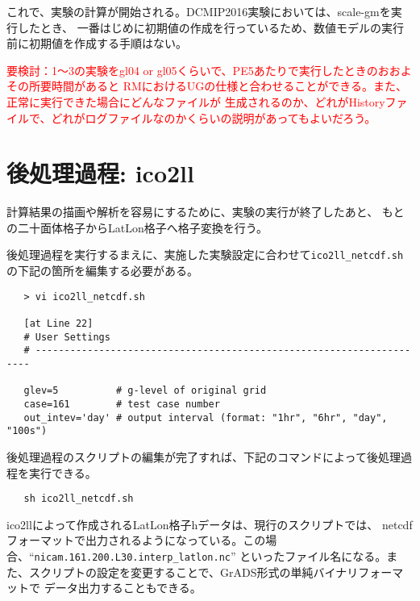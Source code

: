 これで、実験の計算が開始される。DCMIP2016実験においては、scale-gmを実行したとき、
一番はじめに初期値の作成を行っているため、数値モデルの実行前に初期値を作成する手順はない。

\textcolor{red}{要検討：1〜3の実験をgl04 or gl05くらいで、PE5あたりで実行したときのおおよその所要時間があると
 RMにおけるUGの仕様と合わせることができる。また、正常に実行できた場合にどんなファイルが
 生成されるのか、どれがHistoryファイルで、どれがログファイルなのかくらいの説明があってもよいだろう。}


\section{後処理過程: ico2ll}
計算結果の描画や解析を容易にするために、実験の実行が終了したあと、
もとの二十面体格子からLatLon格子へ格子変換を行う。

後処理過程を実行するまえに、実施した実験設定に合わせて\verb|ico2ll_netcdf.sh|
の下記の箇所を編集する必要がある。
 \begin{verbatim}
   > vi ico2ll_netcdf.sh

   [at Line 22]
   # User Settings
   # ---------------------------------------------------------------------

   glev=5          # g-level of original grid
   case=161        # test case number
   out_intev='day' # output interval (format: "1hr", "6hr", "day", "100s")
 \end{verbatim}

 \noindent 後処理過程のスクリプトの編集が完了すれば、下記のコマンドによって後処理過程を実行できる。
 \begin{verbatim}
   sh ico2ll_netcdf.sh
 \end{verbatim}


 \noindent ico2llによって作成されるLatLon格子hデータは、現行のスクリプトでは、
netcdfフォーマットで出力されるようになっている。この場合、``\verb|nicam.161.200.L30.interp_latlon.nc|''
といったファイル名になる。また、スクリプトの設定を変更することで、GrADS形式の単純バイナリフォーマットで
データ出力することもできる。

